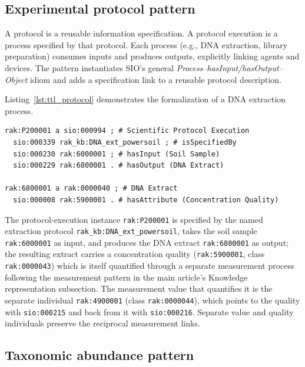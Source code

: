 \subsection{Experimental protocol pattern}

A protocol is a reusable information specification. A protocol
execution is a process specified by that protocol. Each process (e.g., DNA extraction, library preparation)
consumes inputs and produces outputs, explicitly linking agents and
devices. The pattern instantiates SIO's general
\emph{Process--hasInput/hasOutput--Object} idiom and adds a
specification link to a reusable protocol description.



Listing~\ref{lst:ttl_protocol} demonstrates the formalization
of a DNA extraction process.

\begin{lstlisting}[caption={Turtle representation of a DNA extraction protocol.}, label={lst:ttl_protocol}, basicstyle=\ttfamily\scriptsize, frame=single]
rak:P200001 a sio:000994 ; # Scientific Protocol Execution
  sio:000339 rak_kb:DNA_ext_powersoil ; # isSpecifiedBy
  sio:000230 rak:6000001 ; # hasInput (Soil Sample)
  sio:000229 rak:6800001 . # hasOutput (DNA Extract)

rak:6800001 a rak:0000040 ; # DNA Extract
  sio:000008 rak:5900001 . # hasAttribute (Concentration Quality)
\end{lstlisting}

The protocol-execution instance \texttt{rak:P200001}
is specified by the named extraction protocol
\texttt{rak\_kb:DNA\_ext\_powersoil}, takes the soil sample
\texttt{rak:6000001} as input, and produces the DNA extract
\texttt{rak:6800001} as output; the resulting extract carries a
concentration quality (\texttt{rak:5900001}, class
\texttt{rak:0000043}) which is itself
quantified through a separate measurement process following the
measurement pattern in the main article's Knowledge representation subsection. The measurement value that
quantifies it is the separate individual \texttt{rak:4900001}
(class \texttt{rak:0000044}), which points to the quality with
\texttt{sio:000215} and back from it with \texttt{sio:000216}.
Separate value and quality individuals preserve the reciprocal
measurement links.

\subsection{Taxonomic abundance pattern}

